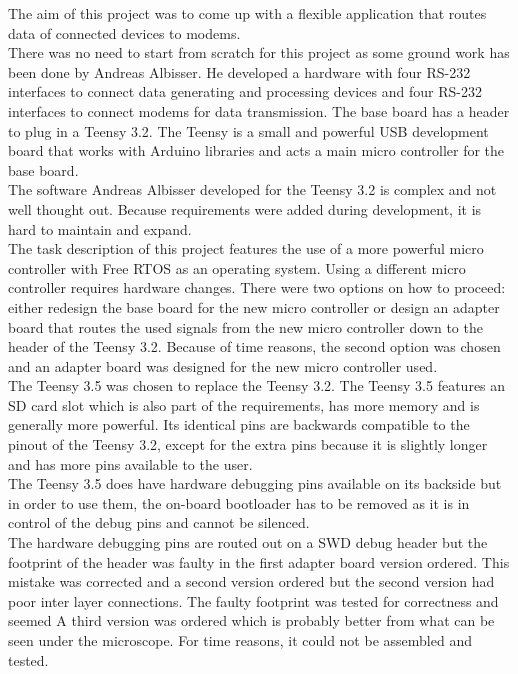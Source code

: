 %
The aim of this project was to come up with a flexible application that routes data of connected devices to modems.\\
There was no need to start from scratch for this project as some ground work has been done by Andreas Albisser. He developed a hardware with four RS-232 interfaces to connect data generating and processing devices and four RS-232 interfaces to connect modems for data transmission. The base board has a header to plug in a Teensy 3.2. The Teensy is a small and powerful USB development board that works with Arduino libraries and acts a main micro controller for the base board.\\
The software Andreas Albisser developed for the Teensy 3.2 is complex and not well thought out. Because requirements were added during development, it is hard to maintain and expand.\\
The task description of this project features the use of a more powerful micro controller with Free RTOS as an operating system. Using a different micro controller requires hardware changes. There were two options on how to proceed: either redesign the base board for the new micro controller or design an adapter board that routes the used signals from the new micro controller down to the header of the Teensy 3.2. Because of time reasons, the second option was chosen and an adapter board was designed for the new micro controller used.\\
The Teensy 3.5 was chosen to replace the Teensy 3.2. The Teensy 3.5 features an SD card slot which is also part of the requirements, has more memory and is generally more powerful. Its identical pins are backwards compatible to the pinout of the Teensy 3.2, except for the extra pins because it is slightly longer and has more pins available to the user.\\
The Teensy 3.5 does have hardware debugging pins available on its backside but in order to use them, the on-board bootloader has to be removed as it is in control of the debug pins and cannot be silenced.\\
The hardware debugging pins are routed out on a SWD debug header but the footprint of the header was faulty in the first adapter board version ordered. This mistake was corrected and a second version ordered but the second version had poor inter layer connections. The faulty footprint was tested for correctness and seemed A third version was ordered which is probably better from what can be seen under the microscope. For time reasons, it could not be assembled and tested.\\
